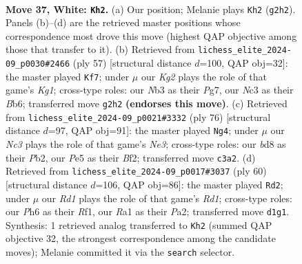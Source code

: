 \documentclass[11pt]{article}
\begin{document}
\clearpage

\begin{figure}[p]\centering
\begin{subfigure}{0.46\textwidth}\centering
\resizebox{\linewidth}{!}{%
\newchessgame
\chessboard[
  setfen={rn1b2r1/1pk2b1p/6pP/p2pPp2/P7/1NN3P1/1B4K1/R2R4 w - - 17 37},
  showmover=false,
  pgfstyle=straightmove, color=movearrow, markmove={g2-h2}
]}
\caption{}
\end{subfigure}\hfill
\begin{subfigure}{0.46\textwidth}\centering
\resizebox{\linewidth}{!}{%
\newchessgame
\chessboard[
  setfen={2r3k1/6p1/1b1p3p/n1rPp3/Pp2B2P/5P2/1PP1K1P1/2RR4 b - - 0 29},
  showmover=false,
  pgfstyle=straightmove, color=movearrow, markmove={g8-f7}
]}
\caption{}
\end{subfigure}
\\[4pt]
\begin{subfigure}{0.46\textwidth}\centering
\resizebox{\linewidth}{!}{%
\newchessgame
\chessboard[
  setfen={3r4/1k1rn3/1p3p2/p2pb1p1/P7/2PRN1PP/1P3BK1/3R4 w - - 9 39},
  showmover=false,
  pgfstyle=straightmove, color=movearrow, markmove={e3-g4}
]}
\caption{}
\end{subfigure}\hfill
\begin{subfigure}{0.46\textwidth}\centering
\resizebox{\linewidth}{!}{%
\newchessgame
\chessboard[
  setfen={r7/1bk4r/pp1bpPp1/3p4/8/2N2N2/PPP3PP/3RKR2 w - - 11 31},
  showmover=false,
  pgfstyle=straightmove, color=movearrow, markmove={d1-d2}
]}
\caption{}
\end{subfigure}
\caption{\textbf{Move 37, White: \texttt{Kh2}.} (a) Our position; Melanie plays \texttt{Kh2} (\texttt{g2h2}). Panels (b)--(d) are the retrieved master positions whose correspondence most drove this move (highest QAP objective among those that transfer to it). (b) Retrieved from \texttt{lichess\_elite\_2024-09\_p0030\#2466} (ply 57) [structural distance $d$=100, QAP obj=32]: the master played \texttt{Kf7}; under $\mu$ our \emph{Kg2} plays the role of that game's \emph{Kg1}; cross-type roles: our \emph{N}b3 as their \emph{P}g7, our \emph{N}c3 as their \emph{B}b6; transferred move \texttt{g2h2} \textbf{(endorses this move)}. (c) Retrieved from \texttt{lichess\_elite\_2024-09\_p0021\#3332} (ply 76) [structural distance $d$=97, QAP obj=91]: the master played \texttt{Ng4}; under $\mu$ our \emph{Nc3} plays the role of that game's \emph{Ne3}; cross-type roles: our \emph{b}d8 as their \emph{P}b2, our \emph{P}e5 as their \emph{B}f2; transferred move \texttt{c3a2}. (d) Retrieved from \texttt{lichess\_elite\_2024-09\_p0017\#3037} (ply 60) [structural distance $d$=106, QAP obj=86]: the master played \texttt{Rd2}; under $\mu$ our \emph{Rd1} plays the role of that game's \emph{Rd1}; cross-type roles: our \emph{P}h6 as their \emph{R}f1, our \emph{R}a1 as their \emph{P}a2; transferred move \texttt{d1g1}. Synthesis: 1 retrieved analog transferred to \texttt{Kh2} (summed QAP objective 32, the strongest correspondence among the candidate moves); Melanie committed it via the \texttt{search} selector.}
\label{fig:thought-m72}
\end{figure}
\end{document}

